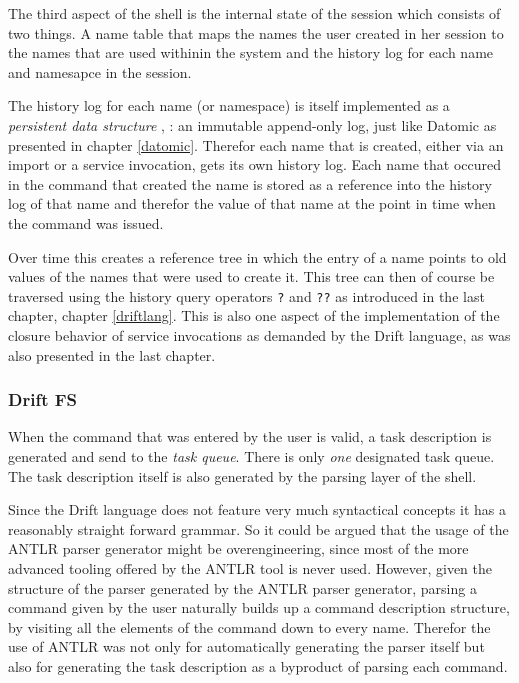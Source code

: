The third aspect of the shell is the internal state of the session
which consists of two things. A name table that maps the names the
user created in her session to the names that are used withinin the
system and the history log for each name and namesapce in the session.

The history log for each name (or namespace) is itself implemented as a
\textit{persistent data structure} \cite{pds-paper}, \cite{pds-book}:
an immutable append-only log, just like Datomic as presented in
chapter \ref{datomic}. Therefor each name that is
created, either via an import or a service invocation, gets its
own history log. Each name that occured in the command
that created the name is stored as a reference into the
history log of that name and therefor the value of that name
at the point in time when the command was issued.

Over time this creates a reference tree in which the entry of a name
points to old values of the names that were used to create it. This
tree can then of course be traversed using the history query
operators \texttt{?} and \texttt{??} as introduced in the last
chapter, chapter \ref{driftlang}. This is also one aspect of the
implementation of the closure behavior of service invocations as
demanded by the Drift language, as was also presented in the last
chapter.

\subsubsection{Drift FS}
\label{driftfs}
When the command that was entered by the user is valid, a
task description is generated and send to the \textit{task queue}.
There is only  \textit{one} designated task queue. The task description
itself is also generated by the parsing layer of the shell.

Since the Drift language does not feature very much syntactical
concepts it has a reasonably straight forward grammar. So it could
be argued that the usage of the ANTLR parser generator might be
overengineering, since most of the more advanced tooling offered
by the ANTLR tool is never used. However, given the structure
of the parser generated by the ANTLR parser generator, parsing
a command given by the user naturally builds up a command
description structure, by visiting all the elements of the
command down to every name. Therefor the use of ANTLR was not only for
automatically generating the parser itself but also for generating the
task description as a byproduct of parsing each command.

